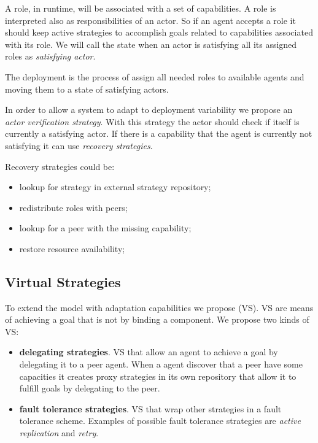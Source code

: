 A role, in runtime, will be associated with a set of capabilities. A role is interpreted also as responsibilities of an actor. So if an agent accepts a role it should keep active strategies to accomplish goals related to capabilities associated with its role.
We will call the state when an actor is satisfying all its assigned roles as \textit{satisfying actor}.

The deployment is the process of assign all needed roles to available agents and moving them to a state of satisfying actors.

In order to allow a system to adapt to deployment variability we propose an \textit{actor verification strategy}. With this strategy the actor should check if itself is currently a satisfying actor. If there is a capability that the agent is currently not satisfying it can use \textit{recovery strategies}.

Recovery strategies could be:
\begin{itemize}
  \item lookup for strategy in external strategy repository;
  \item redistribute roles with peers;
  \item lookup for a peer with the missing capability;
  \item restore resource availability;
\end{itemize}

\subsection{Virtual Strategies}

To extend the model with adaptation capabilities we propose  (VS). VS are means of achieving a goal that is not by binding a component. We propose two kinds of VS:

\begin{itemize}
  \item \textbf{delegating strategies}. VS that allow an agent to achieve a goal by delegating it to a peer agent. When a agent discover that a peer have some capacities it creates proxy strategies in its own repository that allow it to fulfill goals by delegating to the peer.
  \item \textbf{fault tolerance strategies}. VS that wrap other strategies in a fault tolerance scheme. Examples of possible fault tolerance strategies are \textit{active replication} and \textit{retry}.
\end{itemize}

